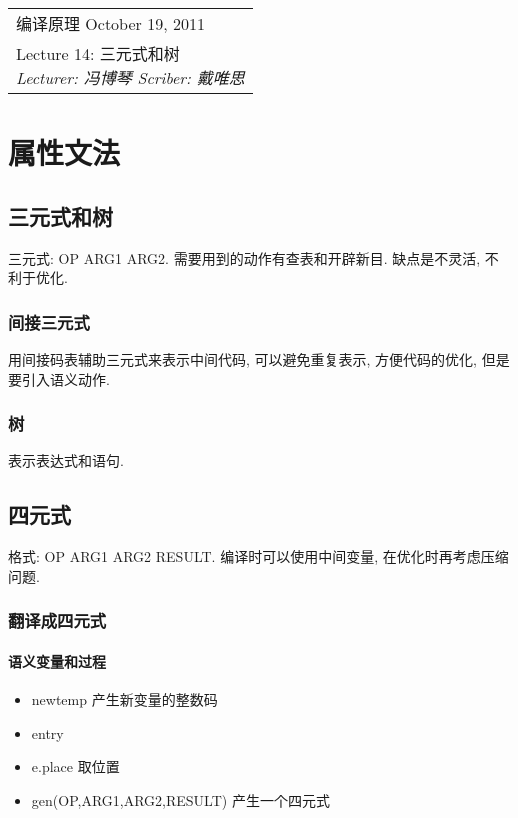 \def\lecture{14}
\clearpage \noindent\begin{tabularx}{\linewidth}{|X|}
\hline \vskip -2mm
{\sf 编译原理} \hfill October 19, 2011 \\
{\centering \sf \large Lecture \lecture:
三元式和树 \\ }
\textsl{Lecturer: 冯博琴 \hfill Scriber: 戴唯思}\\ \hline
\end{tabularx}
\setcounter{section}{0}
\renewcommand{\thepage}{\lecture -\arabic{page}}

\section{属性文法}

    \subsection{三元式和树}

        三元式: OP ARG1 ARG2. 需要用到的动作有查表和开辟新目. 缺点是不灵活, 不利于优化.

        \subsubsection{间接三元式}

            用间接码表辅助三元式来表示中间代码, 可以避免重复表示, 方便代码的优化, 但是要引入语义动作.

        \subsubsection{树}

            表示表达式和语句.

    \subsection{四元式}

        格式: OP ARG1 ARG2 RESULT. 编译时可以使用中间变量, 在优化时再考虑压缩问题.

        \subsubsection{翻译成四元式}

            \paragraph{语义变量和过程}
            \begin{itemize}
                \item newtemp 产生新变量的整数码
                \item entry
                \item e.place 取位置
                \item gen(OP,ARG1,ARG2,RESULT) 产生一个四元式
            \end{itemize}

